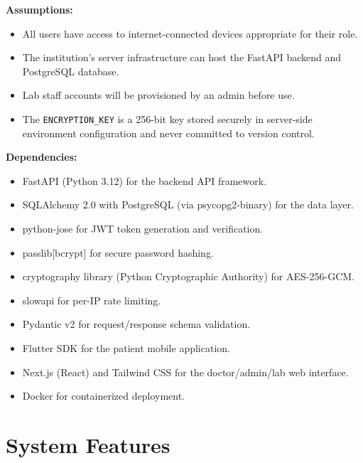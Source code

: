 \documentclass[a4paper,12pt]{report}
\begin{document}
\textbf{Assumptions:}
\begin{itemize}
    \item All users have access to internet-connected devices appropriate for their role.
    \item The institution's server infrastructure can host the FastAPI backend and PostgreSQL database.
    \item Lab staff accounts will be provisioned by an admin before use.
    \item The \texttt{ENCRYPTION\_KEY} is a 256-bit key stored securely in server-side environment configuration and never committed to version control.
\end{itemize}

\textbf{Dependencies:}
\begin{itemize}
    \item FastAPI (Python 3.12) for the backend API framework.
    \item SQLAlchemy 2.0 with PostgreSQL (via psycopg2-binary) for the data layer.
    \item python-jose for JWT token generation and verification.
    \item passlib[bcrypt] for secure password hashing.
    \item cryptography library (Python Cryptographic Authority) for AES-256-GCM.
    \item slowapi for per-IP rate limiting.
    \item Pydantic v2 for request/response schema validation.
    \item Flutter SDK for the patient mobile application.
    \item Next.js (React) and Tailwind CSS for the doctor/admin/lab web interface.
    \item Docker for containerized deployment.
\end{itemize}

\section{System Features}
\end{document}
